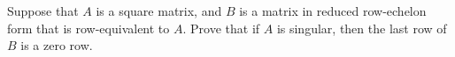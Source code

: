 Suppose that $A$ is a square matrix, and $B$ is a matrix in reduced row-echelon form that is row-equivalent to $A$.  Prove that if $A$ is singular, then the last row of $B$ is a zero row.